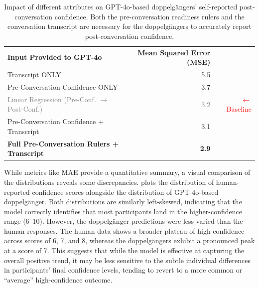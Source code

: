 \begin{table}[ht!]
\centering
\begin{tabular}{@{}lrr@{}}
\cmidrule(r){1-2}
\textbf{Input Provided to GPT-4o} & \textbf{Mean Squared Error (MSE)} & \\
\cmidrule(r){1-2}
Transcript ONLY & 5.5 & \\
Pre-Conversation Confidence ONLY & 3.7 & \\
\textcolor{gray}{Linear Regression (Pre-Conf. $\rightarrow$ Post-Conf.)} & \textcolor{gray}{3.2} & \textcolor{red}{\small $\leftarrow$ Baseline} \\
Pre-Conversation Confidence + Transcript & 3.1 & \\
\textbf{Full Pre-Conversation Rulers + Transcript} & \textbf{2.9} & \\
\cmidrule(r){1-2}
\end{tabular}
\caption[Ablation study on doppelgängers' self-reported post-conversation confidence]{Impact of different attributes on GPT-4o-based doppelgängers' self-reported post-conversation confidence. Both the pre-conversation readiness rulers and the conversation transcript are necessary for the doppelgängers to accurately report post-conversation confidence.}
\label{tab:ablation_results}
\end{table}



While metrics like MAE provide a quantitative summary, a visual comparison of the distributions reveals some discrepancies.  plots the distribution of human-reported confidence scores alongside the distribution of GPT-4o-based doppelgänger. Both distributions are similarly left-skewed, indicating that the model correctly identifies that most participants land in the higher-confidence range (6--10). However, the doppelgänger predictions were less varied than the human responses. The human data shows a broader plateau of high confidence across scores of 6, 7, and 8, whereas the doppelgängers exhibit a pronounced peak at a score of 7. This suggests that while the model is effective at capturing the overall positive trend, it may be less sensitive to the subtle individual differences in participants' final confidence levels, tending to revert to a more common or ``average'' high-confidence outcome.



